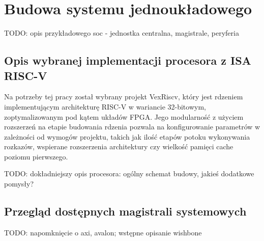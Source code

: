 \section{Budowa systemu jednoukładowego}
TODO: opis przykładowego soc - jednostka centralna, magistrale, peryferia

\subsection{Opis wybranej implementacji procesora z ISA RISC-V}
Na potrzeby tej pracy został wybrany projekt VexRiscv\cite{vexriscv:2018:Online}, który jest rdzeniem implementującym architekturę RISC-V w wariancie 32-bitowym, zoptymalizowanym pod kątem układów FPGA. Jego modularność z użyciem rozszerzeń na etapie budowania rdzenia pozwala na konfigurowanie parametrów w zależności od wymogów projektu, takich jak ilość etapów potoku wykonywania rozkazów, wspierane rozszerzenia architektury czy wielkość pamięci cache poziomu pierwszego.

TODO: dokładniejszy opis procesora: ogólny schemat budowy, jakieś dodatkowe pomysły?

\subsection{Przegląd dostępnych magistrali systemowych}
TODO: napomknięcie o axi, avalon; wstępne opisanie wishbone
